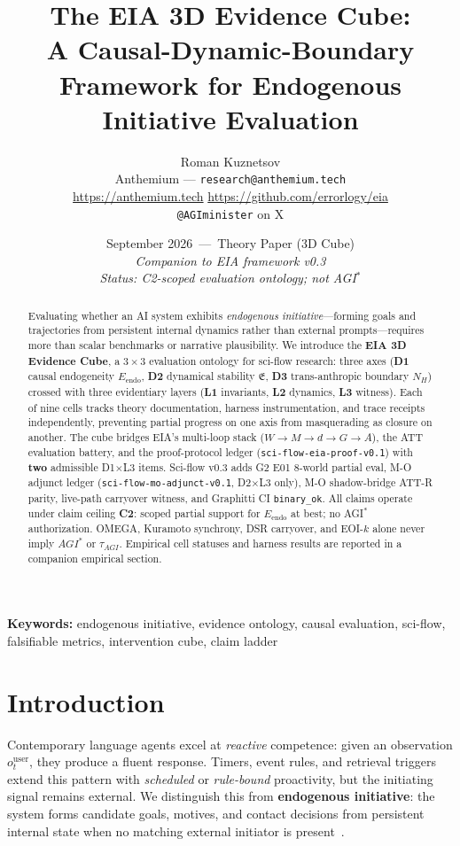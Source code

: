\documentclass[11pt,a4paper]{article}
\title{The EIA 3D Evidence Cube:\\
A Causal-Dynamic-Boundary Framework for Endogenous Initiative Evaluation}
\author{Roman Kuznetsov\\
Anthemium --- \texttt{research@anthemium.tech} \\
\url{https://anthemium.tech} \quad \url{https://github.com/errorlogy/eia} \\
\texttt{@AGIminister} on X
}
\date{September 2026 \,---\, Theory Paper (3D Cube) \\
\small \textit{Companion to EIA framework v0.3} \\
\small \textit{Status: C2-scoped evaluation ontology; not AGI$^{*}$}}
\theoremstyle{definition}
\begin{document}
\maketitle

\begin{abstract}
Evaluating whether an AI system exhibits \emph{endogenous initiative}---forming goals and trajectories from persistent internal dynamics rather than external prompts---requires more than scalar benchmarks or narrative plausibility. We introduce the \textbf{EIA 3D Evidence Cube}, a $3\times 3$ evaluation ontology for sci-flow research: three axes (\textbf{D1} causal endogeneity $E_{\mathrm{endo}}$, \textbf{D2} dynamical stability $\mathfrak{E}$, \textbf{D3} trans-anthropic boundary $N_H$) crossed with three evidentiary layers (\textbf{L1} invariants, \textbf{L2} dynamics, \textbf{L3} witness). Each of nine cells tracks theory documentation, harness instrumentation, and trace receipts independently, preventing partial progress on one axis from masquerading as closure on another. The cube bridges EIA's multi-loop stack ($W\to M\to d\to G\to A$), the ATT evaluation battery, and the proof-protocol ledger (\texttt{sci-flow-eia-proof-v0.1}) with \textbf{two} admissible D1$\times$L3 items. Sci-flow v0.3 adds G2 E01 8-world partial eval, M-O adjunct ledger (\texttt{sci-flow-mo-adjunct-v0.1}, D2$\times$L3 only), M-O shadow-bridge ATT-R parity, live-path carryover witness, and Graphitti CI \texttt{binary\_ok}. All claims operate under claim ceiling \textbf{C2}: scoped partial support for $E_{\mathrm{endo}}$ at best; no AGI$^{*}$ authorization. OMEGA, Kuramoto synchrony, DSR carryover, and EOI-$k$ alone never imply $AGI^{*}$ or $\tau_{AGI}$. Empirical cell statuses and harness results are reported in a companion empirical section.
\end{abstract}

\noindent\textbf{Keywords:} endogenous initiative, evidence ontology, causal evaluation, sci-flow, falsifiable metrics, intervention cube, claim ladder

\section{Introduction}\label{sec:intro}

Contemporary language agents excel at \emph{reactive} competence: given an observation $o_t^{\mathrm{user}}$, they produce a fluent response. Timers, event rules, and retrieval triggers extend this pattern with \emph{scheduled} or \emph{rule-bound} proactivity, but the initiating signal remains external. We distinguish this from \textbf{endogenous initiative}: the system forms candidate goals, motives, and contact decisions from persistent internal state when no matching external initiator is present~\cite{kuznetsov2026causal}.
\end{document}
